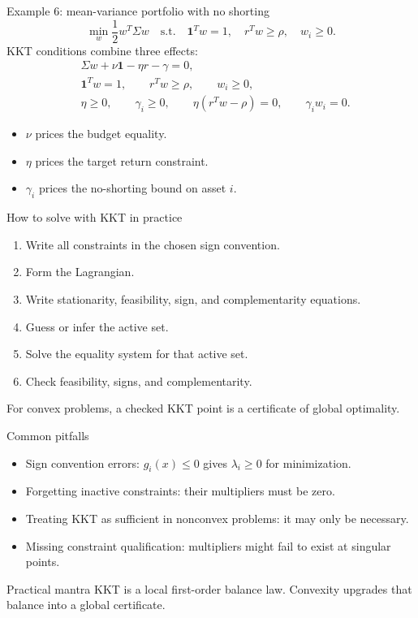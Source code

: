 \documentclass[aspectratio=169]{beamer}
\begin{document}
\begin{frame}{Example 6: mean-variance portfolio with no shorting}
  \[
    \min_w \frac12 w^T\Sigma w
    \quad\text{s.t.}\quad \mathbf{1}^Tw=1,
    \quad r^Tw\ge \rho,
    \quad w_i\ge0.
  \]
  KKT conditions combine three effects:
  \begin{align*}
    &\Sigma w+\nu\mathbf{1}-\eta r-\gamma=0,\\
    &\mathbf{1}^Tw=1,
      \qquad r^Tw\ge\rho,
      \qquad w_i\ge0,\\
    &\eta\ge0,
      \qquad \gamma_i\ge0,
      \qquad \eta(r^Tw-\rho)=0,
      \qquad \gamma_iw_i=0.
  \end{align*}
  \vspace{.2em}
  \begin{itemize}
    \item $\nu$ prices the budget equality.
    \item $\eta$ prices the target return constraint.
    \item $\gamma_i$ prices the no-shorting bound on asset $i$.
  \end{itemize}
\end{frame}

\begin{frame}{How to solve with KKT in practice}
  \begin{enumerate}
    \item Write all constraints in the chosen sign convention.
    \item Form the Lagrangian.
    \item Write stationarity, feasibility, sign, and complementarity equations.
    \item Guess or infer the active set.
    \item Solve the equality system for that active set.
    \item Check feasibility, signs, and complementarity.
  \end{enumerate}
  \vspace{.5em}
  For convex problems, a checked KKT point is a certificate of global optimality.
\end{frame}

\begin{frame}{Common pitfalls}
  \begin{itemize}
    \item Sign convention errors: $g_i(x)\le0$ gives $\lambda_i\ge0$ for minimization.
    \item Forgetting inactive constraints: their multipliers must be zero.
    \item Treating KKT as sufficient in nonconvex problems: it may only be necessary.
    \item Missing constraint qualification: multipliers might fail to exist at singular points.
  \end{itemize}
  \vspace{.6em}
  \begin{block}{Practical mantra}
    KKT is a local first-order balance law. Convexity upgrades that balance into a global certificate.
  \end{block}
\end{frame}
\end{document}
